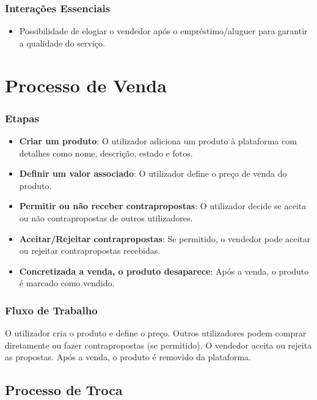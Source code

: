 \documentclass[a4paper, 12pt]{article} %
\begin{document}
\subsubsection{Interações Essenciais}
\begin{itemize}
	\item Possibilidade de elogiar o vendedor após o empréstimo/aluguer para garantir a qualidade do serviço.
\end{itemize}

\section{Processo de Venda}

\subsubsection{Etapas}
\begin{itemize}
	\item \textbf{Criar um produto}: O utilizador adiciona um produto à plataforma com detalhes como nome, descrição, estado e fotos.
	\item \textbf{Definir um valor associado}: O utilizador define o preço de venda do produto.
	\item \textbf{Permitir ou não receber contrapropostas}: O utilizador decide se aceita ou não contrapropostas de outros utilizadores.
	\item \textbf{Aceitar/Rejeitar contrapropostas}: Se permitido, o vendedor pode aceitar ou rejeitar contrapropostas recebidas.
	\item \textbf{Concretizada a venda, o produto desaparece}: Após a venda, o produto é marcado como vendido.
\end{itemize}

\subsubsection{Fluxo de Trabalho}
O utilizador cria o produto e define o preço. Outros utilizadores podem comprar diretamente ou fazer contrapropostas (se permitido). O vendedor aceita ou rejeita as propostas. Após a venda, o produto é removido da plataforma.

\subsection{Processo de Troca}
\end{document}

